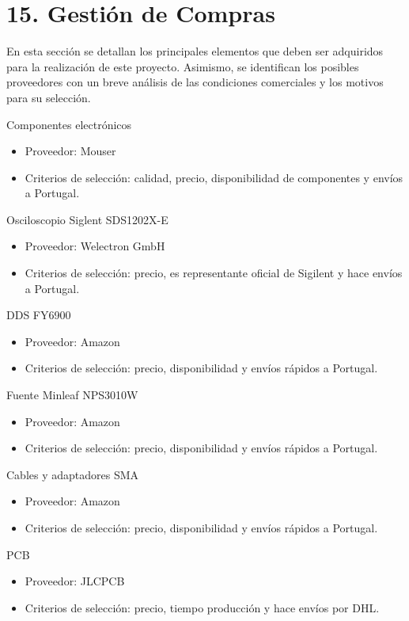 \documentclass[11pt]{charter}
\begin{document}
\section{15. Gestión de Compras}
\label{sec:compras}
En esta sección se detallan los principales elementos que deben ser adquiridos para la realización de este proyecto. Asimismo, se identifican los posibles proveedores con un breve análisis de las condiciones comerciales y los motivos para su selección.

Componentes electrónicos
\begin{itemize}
\item Proveedor: Mouser
\item Criterios de selección: calidad, precio, disponibilidad de componentes y envíos a Portugal.
\end{itemize}

Osciloscopio Siglent SDS1202X-E
\begin{itemize}
\item Proveedor: Welectron GmbH
\item Criterios de selección: precio, es representante oficial de Sigilent y hace envíos a Portugal.
\end{itemize}

DDS FY6900
\begin{itemize}
\item Proveedor: Amazon
\item Criterios de selección: precio, disponibilidad y envíos rápidos a Portugal.
\end{itemize}

Fuente Minleaf NPS3010W
\begin{itemize}
\item Proveedor: Amazon
\item Criterios de selección: precio, disponibilidad y envíos rápidos a Portugal.
\end{itemize}

Cables y adaptadores SMA
\begin{itemize}
\item Proveedor: Amazon
\item Criterios de selección: precio, disponibilidad y envíos rápidos a Portugal.
\end{itemize}

PCB
\begin{itemize}
\item Proveedor: JLCPCB
\item Criterios de selección: precio, tiempo producción y hace envíos por DHL.
\end{itemize}
\end{document}
